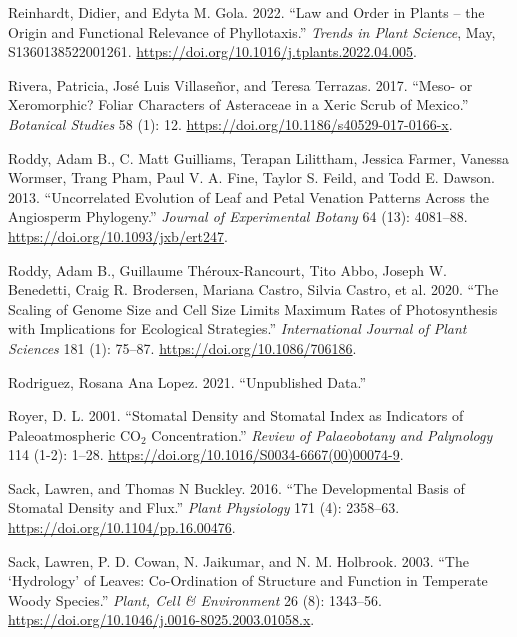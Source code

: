 \documentclass[
  12pt,
]{article}
\newlength{\cslhangindent}
\newlength{\cslentryspacingunit} %
\newenvironment{CSLReferences}[2] %
 {%
  \setlength{\parindent}{0pt}
  \ifodd #1
  \let\oldpar\par
  \def\par{\hangindent=\cslhangindent\oldpar}
  \fi
  \setlength{\parskip}{#2\cslentryspacingunit}
 }%
 {}
\begin{document}
\begin{CSLReferences}{1}{0}
\leavevmode{}%
Reinhardt, Didier, and Edyta M. Gola. 2022. {``Law and Order in Plants -- the Origin and Functional Relevance of Phyllotaxis.''} \emph{Trends in Plant Science}, May, S1360138522001261. \url{https://doi.org/10.1016/j.tplants.2022.04.005}.

\leavevmode{}%
Rivera, Patricia, José Luis Villaseñor, and Teresa Terrazas. 2017. {``Meso- or Xeromorphic? {Foliar} Characters of {Asteraceae} in a Xeric Scrub of {Mexico}.''} \emph{Botanical Studies} 58 (1): 12. \url{https://doi.org/10.1186/s40529-017-0166-x}.

\leavevmode{}%
Roddy, Adam B., C. Matt Guilliams, Terapan Lilittham, Jessica Farmer, Vanessa Wormser, Trang Pham, Paul V. A. Fine, Taylor S. Feild, and Todd E. Dawson. 2013. {``Uncorrelated Evolution of Leaf and Petal Venation Patterns Across the Angiosperm Phylogeny.''} \emph{Journal of Experimental Botany} 64 (13): 4081--88. \url{https://doi.org/10.1093/jxb/ert247}.

\leavevmode{}%
Roddy, Adam B., Guillaume Théroux-Rancourt, Tito Abbo, Joseph W. Benedetti, Craig R. Brodersen, Mariana Castro, Silvia Castro, et al. 2020. {``The {Scaling} of {Genome} {Size} and {Cell} {Size} {Limits} {Maximum} {Rates} of {Photosynthesis} with {Implications} for {Ecological} {Strategies}.''} \emph{International Journal of Plant Sciences} 181 (1): 75--87. \url{https://doi.org/10.1086/706186}.

\leavevmode{}%
Rodriguez, Rosana Ana Lopez. 2021. {``Unpublished Data.''}

\leavevmode{}%
Royer, D. L. 2001. {``Stomatal Density and Stomatal Index as Indicators of Paleoatmospheric {CO}\(_{\textrm{2}}\) Concentration.''} \emph{Review of Palaeobotany and Palynology} 114 (1-2): 1--28. \url{https://doi.org/10.1016/S0034-6667(00)00074-9}.

\leavevmode{}%
Sack, Lawren, and Thomas N Buckley. 2016. {``The Developmental Basis of Stomatal Density and Flux.''} \emph{Plant Physiology} 171 (4): 2358--63. \url{https://doi.org/10.1104/pp.16.00476}.

\leavevmode{}%
Sack, Lawren, P. D. Cowan, N. Jaikumar, and N. M. Holbrook. 2003. {``The {`Hydrology'} of Leaves: Co-Ordination of Structure and Function in Temperate Woody Species.''} \emph{Plant, Cell \& Environment} 26 (8): 1343--56. \url{https://doi.org/10.1046/j.0016-8025.2003.01058.x}.


\end{CSLReferences}
\end{document}
